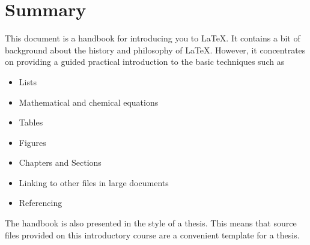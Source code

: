 \chapter*{Summary}
This document is a handbook for introducing you to \LaTeX. It contains a bit of background about the history and philosophy of \LaTeX.  However, it concentrates on providing a guided practical introduction to the basic techniques such as 
\begin{itemize}
\item Lists
\item Mathematical and chemical equations
\item Tables
\item Figures
\item Chapters and Sections
\item Linking to other files in large documents
\item Referencing
\end{itemize}

The handbook is also presented in the style of a thesis. This means that source files provided on this introductory course are a convenient template for a thesis.
